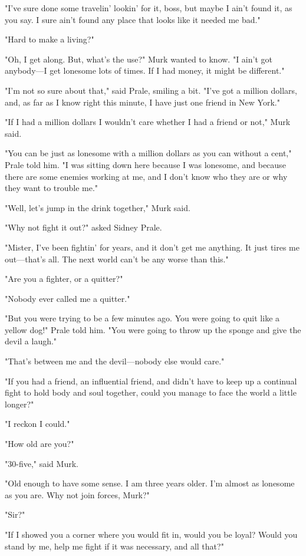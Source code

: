 \documentclass{novel}
\begin{document}
"I've sure done some travelin' lookin' for it, boss, but maybe I ain't found it, as you say. I sure ain't found any place that looks like it needed me bad."

"Hard to make a living?"

"Oh, I get along. But, what's the use?" Murk wanted to know. "I ain't got anybody---I get lonesome lots of times. If I had money, it might be different."

"I'm not so sure about that," said Prale, smiling a bit. "I've got a million dollars, and, as far as I know right this minute, I have just one friend in New York."

"If I had a million dollars I wouldn't care whether I had a friend or not," Murk said.

"You can be just as lonesome with a million dollars as you can without a cent," Prale told him. "I was sitting down here because I was lonesome, and because there are some enemies working at me, and I don't know who they are or why they want to trouble me."

"Well, let's jump in the drink together," Murk said.

"Why not fight it out?" asked Sidney Prale.

"Mister, I've been fightin' for years, and it don't get me anything. It just tires me out---that's all. The next world can't be any worse than this."

"Are you a fighter, or a quitter?"

"Nobody ever called me a quitter."

"But you were trying to be a few minutes ago. You were going to quit like a yellow dog!" Prale told him. "You were going to throw up the sponge and give the devil a laugh."

"That's between me and the devil---nobody else would care."

"If you had a friend, an influential friend, and didn't have to keep up a continual fight to hold body and soul together, could you manage to face the world a little longer?"

"I reckon I could."

"How old are you?"

"30-five," said Murk.

"Old enough to have some sense. I am three years older. I'm almost as lonesome as you are. Why not join forces, Murk?"

"Sir?"

"If I showed you a corner where you would fit in, would you be loyal? Would you stand by me, help me fight if it was necessary, and all that?"
\end{document}
